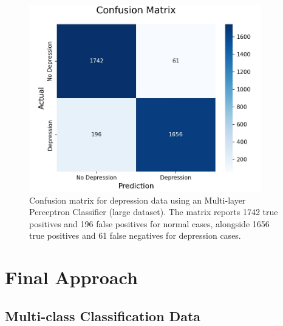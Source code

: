 \documentclass[runningheads,a4paper,11pt]{report}
\begin{document}
\begin{figure}[h]
\centering
\includegraphics[width=0.9\textwidth]{Depression-Data-MLPClassifier.jpg}
\caption[Confusion matrix for depression data ( Multi-layer Perceptron Classifier)]{Confusion matrix for depression data using an  Multi-layer Perceptron Classifier (large dataset). The matrix reports 1742 true positives and 196 false positives for normal cases, alongside 1656 true positives and 61 false negatives for depression cases.}
\end{figure}

\section{Final Approach}
\label{final-approach}
\subsection{Multi-class Classification Data }
\label{section:multi-class-data}
\end{document}
